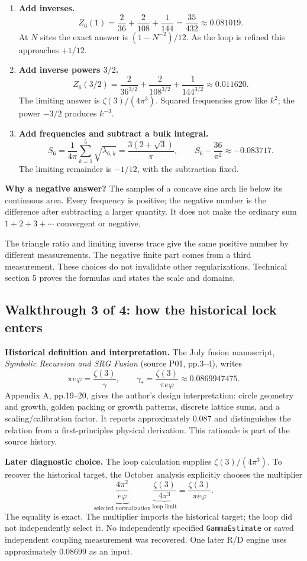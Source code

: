 \documentclass[11pt,a4paper]{article}
\begin{document}
\begin{enumerate}
\item \textbf{Add inverses.}
\[
Z_6(1)=\frac2{36}+\frac2{108}+\frac1{144}
=\frac{35}{432}\approx0.081019.
\]
At $N$ sites the exact answer is $(1-N^{-2})/12$.
As the loop is refined this approaches $\boxed{+1/12}$.
\item \textbf{Add inverse powers $3/2$.}
\[
Z_6(3/2)=\frac2{36^{3/2}}+\frac2{108^{3/2}}+\frac1{144^{3/2}}
\approx0.011620.
\]
The limiting answer is $\boxed{\zeta(3)/(4\pi^3)}$.
Squared frequencies grow like $k^2$; the power $-3/2$ produces $k^{-3}$.
\item \textbf{Add frequencies and subtract a bulk integral.}
\[
S_6=\frac1{4\pi}\sum_{k=1}^{5}\sqrt{\lambda_{6,k}}
=\frac{3(2+\sqrt3)}{\pi},\qquad
S_6-\frac{36}{\pi^2}\approx-0.083717.
\]
The limiting remainder is $\boxed{-1/12}$, with the subtraction fixed.
\end{enumerate}
\textbf{Why a negative answer?} The samples of a concave sine arch
lie below its continuous area. Every frequency is positive; the negative
number is the difference after subtracting a larger quantity. It does not
make the ordinary sum $1+2+3+\cdots$ convergent or negative.

The triangle ratio and limiting inverse trace give the same positive number
by different measurements. The negative finite part comes from a third
measurement. These choices do not invalidate other regularizations.
Technical section 5 proves the formulas and states the scale and domains.
\clearpage

\subsection*{Walkthrough 3 of 4: how the historical lock enters}
\noindent\textbf{Historical definition and interpretation.}
The July fusion manuscript, \emph{Symbolic Recursion and SRG Fusion}
(source P01, pp.3--4), writes
\[
\pi e\varphi=\frac{\zeta(3)}{\gamma},\qquad
\boxed{\gamma_*=\frac{\zeta(3)}{\pi e\varphi}\approx0.0869947475.}
\]
Appendix A, pp.19--20, gives the author's design interpretation:
circle geometry and growth, golden packing or growth patterns, discrete
lattice sums, and a scaling/calibration factor. It reports approximately
$0.087$ and distinguishes the relation from a first-principles physical
derivation. This rationale is part of the source history.

\medskip
\noindent\textbf{Later diagnostic choice.}
The loop calculation supplies $\zeta(3)/(4\pi^3)$.
To recover the historical target, the October analysis explicitly chooses
the multiplier
\[
\underbrace{\frac{4\pi^2}{e\varphi}}_{\text{selected normalization}}
\ \underbrace{\frac{\zeta(3)}{4\pi^3}}_{\text{loop limit}}
=\frac{\zeta(3)}{\pi e\varphi}.
\]
The equality is exact. The multiplier imports the historical target;
the loop did not independently select it. No independently specified
\texttt{GammaEstimate} or saved independent coupling measurement was recovered.
One later R/D engine uses approximately $0.08699$ as an input.
\end{document}

